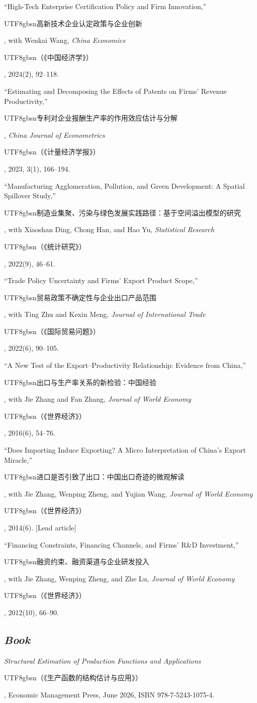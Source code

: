 \documentclass[letterpaper]{article}
\newcommand{\cj}[1]{{\begin{CJK}{UTF8}{gbsn}#1\end{CJK}}}
\begin{document}
\begin{papers}
\item ``High-Tech Enterprise Certification Policy and Firm Innovation,'' \cj{高新技术企业认定政策与企业创新}, with Wenkai Wang, \textit{China Economics} \cj{（《中国经济学》）}, 2024(2), 92--118.

\item ``Estimating and Decomposing the Effects of Patents on Firms' Revenue Productivity,'' \cj{专利对企业报酬生产率的作用效应估计与分解}, \textit{China Journal of Econometrics} \cj{（《计量经济学报》）}, 2023, 3(1), 166--194.

\item ``Manufacturing Agglomeration, Pollution, and Green Development: A Spatial Spillover Study,'' \cj{制造业集聚、污染与绿色发展实践路径：基于空间溢出模型的研究}, with Xiaoshan Ding, Chong Han, and Hao Yu, \textit{Statistical Research} \cj{（《统计研究》）}, 2022(9), 46--61.

\item ``Trade Policy Uncertainty and Firms' Export Product Scope,'' \cj{贸易政策不确定性与企业出口产品范围}, with Ting Zhu and Kexin Meng, \textit{Journal of International Trade} \cj{（《国际贸易问题》）}, 2022(6), 90--105.

\item ``A New Test of the Export--Productivity Relationship: Evidence from China,'' \cj{出口与生产率关系的新检验：中国经验}, with Jie Zhang and Fan Zhang, \textit{Journal of World Economy} \cj{（《世界经济》）}, 2016(6), 54--76.

\item ``Does Importing Induce Exporting? A Micro Interpretation of China's Export Miracle,'' \cj{进口是否引致了出口：中国出口奇迹的微观解读}, with Jie Zhang, Wenping Zheng, and Yujian Wang, \textit{Journal of World Economy} \cj{（《世界经济》）}, 2014(6). [Lead article]

\item ``Financing Constraints, Financing Channels, and Firms' R\&D Investment,'' \cj{融资约束、融资渠道与企业研发投入}, with Jie Zhang, Wenping Zheng, and Zhe Lu, \textit{Journal of World Economy} \cj{（《世界经济》）}, 2012(10), 66--90.
\end{papers}

\subsection*{\textit{Book}}
\textit{Structural Estimation of Production Functions and Applications} \cj{（《生产函数的结构估计与应用》）}, Economic Management Press, June 2026, ISBN 978-7-5243-1075-4.
\end{document}
